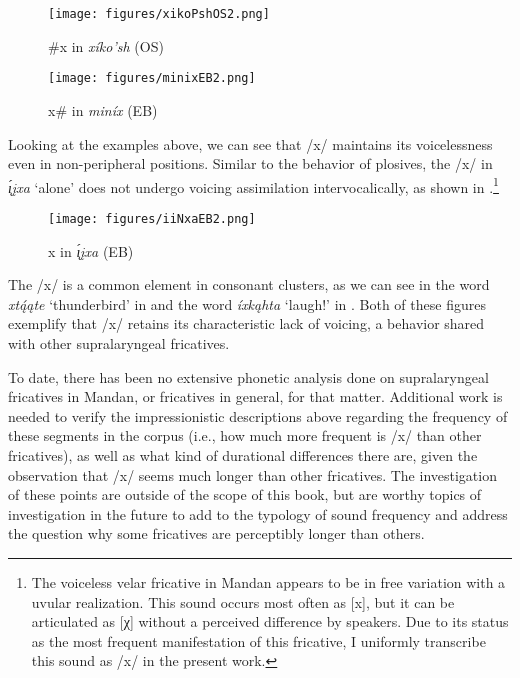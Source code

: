 \begin{figure}

\caption{\#x in \textit{xíko'sh} (OS)}\label{initialX}

\texttt{[image: figures/xikoPshOS2.png]}
\end{figure}



\begin{figure}
\caption{x{\#} in \textit{miníx} (EB)}\label{finalX}
\texttt{[image: figures/minixEB2.png]}

\end{figure}

Looking at the examples above, we can see that /x/ maintains its voicelessness even in non-peripheral positions. Similar to the behavior of plosives, the /x/ in \textit{\'{ı̨}įxa} `alone' does not undergo voicing assimilation intervocalically, as shown in .\footnote{The voiceless velar fricative in Mandan appears to be in free variation with a uvular realization. This sound occurs most often as [x], but it can be articulated as [χ] without a perceived difference by speakers. Due to its status as the most frequent manifestation of this fricative, I uniformly transcribe this sound as /x/ in the present work.}


\begin{figure}[t]
\caption{{\longrule}x{\longrule} in \textit{\'{ı̨}įxa} (EB)}\label{intervocalicX}
\texttt{[image: figures/iiNxaEB2.png]}
\end{figure}

The /x/ is a common element in consonant clusters, as we can see in the word \textit{xtą́ąte} `thunderbird' in  and the word \textit{íxkąhta} `laugh!' in . Both of these figures exemplify that /x/ retains its characteristic lack of voicing, a behavior shared with other supralaryngeal fricatives.

To date, there has been no extensive phonetic analysis done on supralaryngeal fricatives in Mandan, or fricatives in general, for that matter. Additional work is needed to verify the impressionistic descriptions above regarding the frequency of these segments in the corpus (i.e., how much more frequent is /x/ than other fricatives), as well as what kind of durational differences there are, given the observation that /x/ seems much longer than other fricatives. The investigation of these points are outside of the scope of this book, but are worthy topics of investigation in the future to add to the typology of sound frequency and address the question why some fricatives are perceptibly longer than others.


